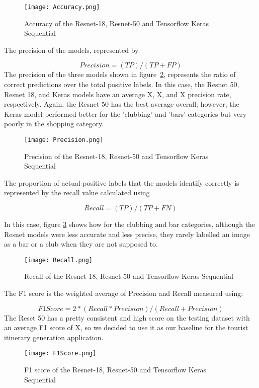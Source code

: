 \begin{figure}[h]
\centering
\texttt{[image: Accuracy.png]}
\caption{Accuracy of the Resnet-18, Resnet-50 and Tensorflow Keras Sequential}
\label{accuracy}
\end{figure}

The precision of the models, represented by

\[Precision = (TP) / (TP+FP)\]
The precision of the three models shown in figure~\ref{precision},
represents the ratio of correct predictions over the total positive labels.
In this case, the Resnet 50, Resnet 18, and Keras models have an average X, X,
and X precision rate, respectively. Again, the Resnet 50 has the best average
overall; however, the Keras model performed better for the 'clubbing' and
'bars' categories but very poorly in the shopping category.

\begin{figure}[h]
\centering
\texttt{[image: Precision.png]}
\caption{Precision of the Resnet-18, Resnet-50 and Tensorflow Keras Sequential}
\label{precision}
\end{figure}

The proportion of actual positive labels that the models identify correctly is
represented by the recall value calculated using 

\[Recall= (TP) / (TP+FN)\]

In this case, figure \ref{recall}
shows how for the clubbing and bar categories, although the Resnet models were
less accurate and less precise, they rarely labelled an image as a bar or a
club when they are not supposed to.

\begin{figure}[h]
\centering
\texttt{[image: Recall.png]}
\caption{Recall of the Resnet-18, Resnet-50 and Tensorflow Keras Sequential}
\label{recall}
\end{figure}

The F1 score is the weighted average of Precision and Recall measured using:

\[F1 Score = 2*(Recall*Precision) / (Recall+Precision)\]
The Reset 50 has a pretty consistent and high score on
the testing dataset with an average F1 score of X, so
we decided to use it as our baseline for the tourist
itinerary generation application.

\begin{figure}[h]
\centering
\texttt{[image: F1Score.png]}
\caption{F1 score of the Resnet-18, Resnet-50 and Tensorflow Keras Sequential}
\label{f1}
\end{figure}
